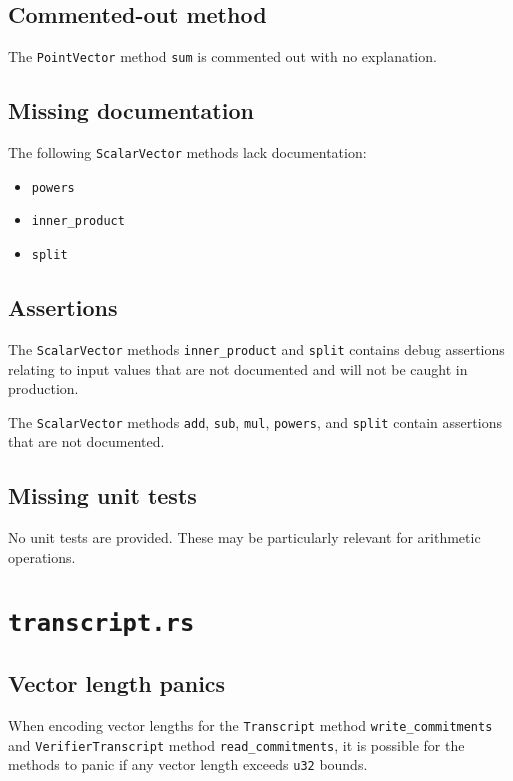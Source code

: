 \documentclass{article}
\begin{document}
\subsection{Commented-out method}

The \texttt{PointVector} method \texttt{sum} is commented out with no explanation.


\subsection{Missing documentation}

The following \texttt{ScalarVector} methods lack documentation:
\begin{itemize}
    \item \texttt{powers}
    \item \texttt{inner\_product}
    \item \texttt{split}
\end{itemize}


\subsection{Assertions}

The \texttt{ScalarVector} methods \texttt{inner\_product} and \texttt{split} contains debug assertions relating to input values that are not documented and will not be caught in production.

The \texttt{ScalarVector} methods \texttt{add}, \texttt{sub}, \texttt{mul}, \texttt{powers}, and \texttt{split} contain assertions that are not documented.


\subsection{Missing unit tests}

No unit tests are provided.
These may be particularly relevant for arithmetic operations.


\section{\texttt{transcript.rs}}

\subsection{Vector length panics}

When encoding vector lengths for the \texttt{Transcript} method \texttt{write\_commitments} and \texttt{VerifierTranscript} method \texttt{read\_commitments}, it is possible for the methods to panic if any vector length exceeds \texttt{u32} bounds.
\end{document}
